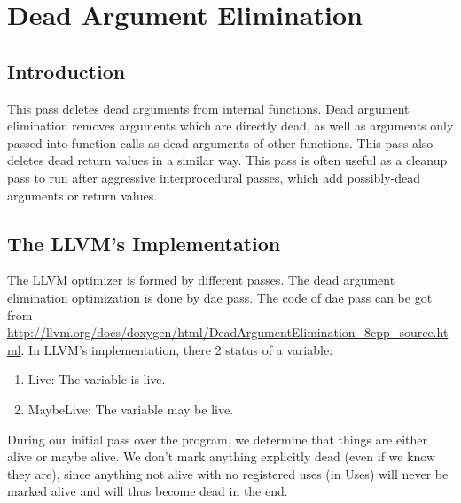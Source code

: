 \chapter{Dead Argument Elimination}

\section{Introduction}
This pass deletes dead arguments from internal functions.  Dead argument elimination removes arguments which are directly dead, as well as arguments only passed into function calls as dead arguments of other functions. This pass also deletes dead return values in a similar way. This pass is often useful as a cleanup pass to run after aggressive interprocedural passes, which add possibly-dead arguments or return values.

\section{The LLVM’s Implementation}
The LLVM optimizer is formed by different passes. The dead argument elimination optimization is done by dae pass. The code of dae pass can be got from  \url{http://llvm.org/docs/doxygen/html/DeadArgumentElimination_8cpp_source.html}. In LLVM’s implementation, there 2 status of a variable:
\begin{enumerate}
\item Live: The variable is live.
\item MaybeLive: The variable may be live.
\end{enumerate}
During our initial pass over the program, we determine that things are either alive or maybe alive. We don't mark anything explicitly dead (even if we know they are), since anything not alive with no registered uses (in Uses) will never be marked alive and will thus become dead in the end.

